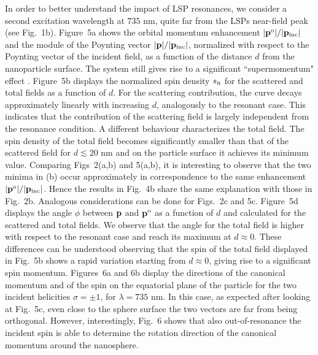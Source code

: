 \documentclass[journal=apchd5,manuscript=article]{achemso}
\begin{document}
In order to better understand the impact of LSP resonances, we consider a second excitation wavelength at $735$ nm, quite far from the LSPs near-field peak (see Fig.~1b). Figure~5a shows the orbital momentum enhancement $|{\bf p}^{\rm o}|/|{\bf p_{\rm inc}}|$ and the module of the Poynting vector $|{\bf p}|/|{\bf p_{\rm inc}}|$, normalized with respect to the Poynting vector of the incident field, as a function of the distance $d$ from the nanoparticle surface. The system still gives rise to a significant  ``supermomentum" effect \cite{Bliokh2014}. 
Figure~5b displays the normalized spin density $s_{\rm n}$ for the scattered and total fields as a function of $d$.  For the scattering contribution, the curve decays approximately linearly with increasing $d$, analogously to the resonant case. This indicates that the contribution of the scattering field is largely independent from the resonance condition. A different behaviour characterizes the total field. The spin density of the total field becomes significantly smaller than that of the scattered field for $d \lesssim 20$ nm and on the particle surface it achieves its minimum value. Comparing Figs~2(a,b) and 5(a,b), it is interesting to observe that the two minima in (b) occur approximately in correspondence to the same enhancement $|{\bf p}^{\rm o}|/|{\bf p_{\rm inc}}|$. Hence the results in Fig.~4b share the same explanation  with those in Fig.~2b. Analogous considerations can be done for Figs.~2c and 5c.
Figure~5d displays the angle $\phi$ between $\bf p$ and ${\bf p}^{\rm o}$ as a function of $d$ and calculated for the scattered and total fields. We observe that the angle for the total field is higher with respect to the resonant case and reach its maximum at $d \approx 0$. These differences can be understood observing that the spin of the total field displayed in Fig.~5b shows a rapid variation starting from $d \approx 0$, giving rise to a significant spin momentum.
Figures~6a and 6b display the directions of the canonical momentum and of the spin on the equatorial plane of the particle for the two incident helicities $\sigma = \pm 1$, for 
$\lambda = 735$ nm. In this case, as expected after looking at Fig.~5c, even close to the sphere surface the two vectors are far from being orthogonal. However, interestingly, Fig.~6 shows that also out-of-resonance the incident spin is able to determine the rotation direction of the canonical momentum around the nanosphere.
\end{document}
